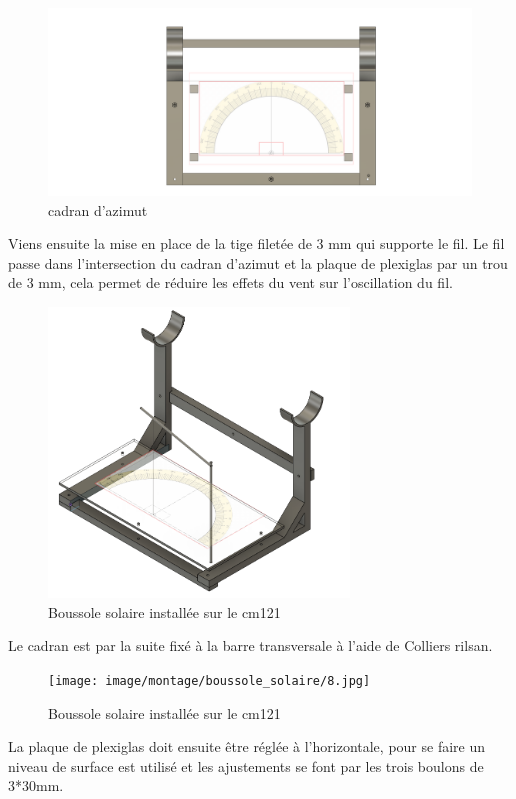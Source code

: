 \documentclass[12pt,a4paper]{article}
\begin{document}
\begin{flushleft}
\begin{figure}[H]
\centering
\includegraphics[width=12cm]{image/montage/boussole_solaire/5.png} 
\caption{cadran d'azimut}
\end{figure}


Viens ensuite la mise en place de la tige filetée de 3 mm qui supporte le fil. Le fil passe dans l'intersection du cadran d'azimut et la plaque de plexiglas par un trou de 3 mm, cela permet de réduire les effets du vent sur l'oscillation du fil.\\

 \begin{figure}[H]
\centering
\includegraphics[width=8cm]{image/montage/boussole_solaire/1.png} 
\caption{Boussole solaire installée sur le cm121}  
\end{figure}

Le cadran est par la suite fixé à la barre transversale à l'aide de Colliers rilsan.

 \begin{figure}[H]
\centering
\texttt{[image: image/montage/boussole\_solaire/8.jpg]} 
\caption{Boussole solaire installée sur le cm121}  
\end{figure}

La plaque de plexiglas doit ensuite être réglée à l'horizontale, pour se faire un niveau de surface est utilisé et les ajustements se font par les trois boulons de 3*30mm.



\end{flushleft}
\end{document}
